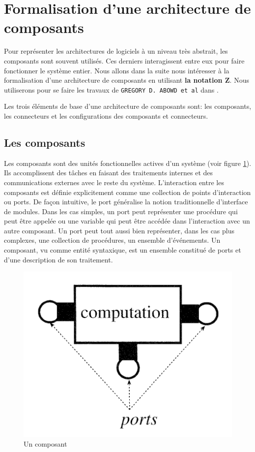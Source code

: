 \section{Formalisation d'une architecture de composants}
Pour représenter les architectures de logiciels à un niveau très abstrait, les composants sont souvent utilisés. Ces derniers interagissent entre eux pour faire fonctionner le système entier. Nous allons dans la suite nous intéresser à la formalisation d'une architecture de composants en utilisant \textbf{la notation Z}. Nous utiliserons pour se faire les travaux de \texttt{GREGORY D. ABOWD et al} dans \cite{Gregory1995}. 

Les trois éléments de base d'une architecture de composants sont: les composants, les connecteurs et les configurations des composants et connecteurs. 
\subsection{Les composants}
Les composants sont des unités fonctionnelles actives d'un système (voir figure \ref{fig:Z_component}). Ils accomplissent des tâches en faisant des traitements internes et des communications externes avec le reste du système. L'interaction entre les composants est définie explicitement comme une collection de points d'interaction ou ports. De façon intuitive, le port généralise la notion traditionnelle d'interface de modules. Dans les cas simples, un port peut représenter une procédure qui peut être appelée ou une variable qui peut être accédée dans l'interaction avec un autre composant. Un port peut tout aussi bien représenter, dans les cas plus complexes, une collection de procédures, un ensemble d’événements. Un composant, vu comme entité syntaxique, est un ensemble constitué de ports et d'une description de son traitement.
\begin{figure}[h!]
  \includegraphics[scale=0.7]{images/composant_Z.png}
  \caption{Un composant}
  \label{fig:Z_component}
\end{figure}
